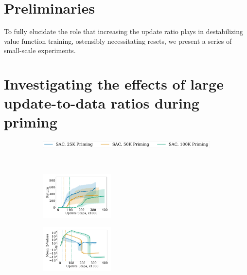 \section{Preliminaries} \label{sec:overestimation:preliminaries}

To fully elucidate the role that increasing the update ratio plays in destabilizing value function training, ostensibly necessitating resets, we present a series of small-scale experiments.

\section{Investigating the effects of large update-to-data ratios during priming} \label{sec:overestimation:investigating}

\begin{figure}[t!]
\centering
    \begin{subfigure}[b]{0.8\textwidth}
        \centering
        \includegraphics[height=0.4cm]{figures/dissecting/priming/priming_base_return_legend.pdf}
    \end{subfigure}\\%
    \begin{subfigure}[b]{0.25\textwidth}
        \centering
        \includegraphics[width=3.7cm, trim=1cm 1cm 1cm 1cm ,clip]{figures/dissecting/priming/priming_base_return.pdf}
        \label{subfig:overestimation:priming_base_ret}
    \end{subfigure}%
    \begin{subfigure}[b]{0.25\textwidth}
    \centering
        \includegraphics[width=3.7cm, trim=1cm 1cm 1cm 1cm ,clip]{figures/dissecting/priming/priming_base_Q.pdf}
        \label{subfig:overestimation:priming_base_Q}
    \end{subfigure}%
    \begin{subfigure}[b]{0.25\textwidth}

\end{subfigure}
\end{figure}
